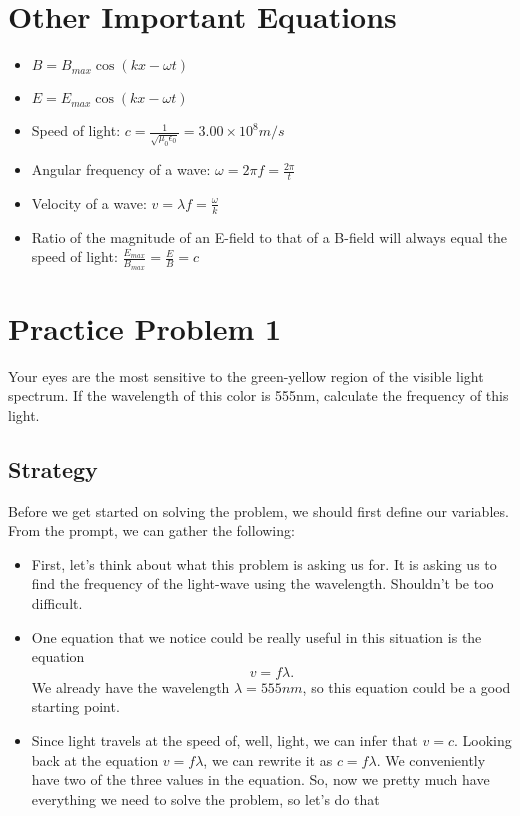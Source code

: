 \documentclass[12pt]{article}
\begin{document}
\section*{Other Important Equations}
\begin{itemize}
    \item \(B = B_{max}\cos{(kx-\omega t)}\)
    \item \(E = E_{max}\cos{(kx-\omega t)}\)
    \item Speed of light: \(c = \frac{1}{\sqrt{\mu_{0}\epsilon_{0}}} = 3.00\times 10^{8}m/s\)
    \item Angular frequency of a wave: \(\omega = 2\pi f = \frac{2\pi}{t}\)
    \item Velocity of a wave: \(v = \lambda f = \frac{\omega}{k}\)
    \item Ratio of the magnitude of an E-field to that of a B-field will always equal the speed of light: \( \frac{E_{max}}{B_{max}} =\frac{E}{B} = c\)
\end{itemize}


\section*{Practice Problem 1}
Your eyes are the most sensitive to the green-yellow region of the visible light spectrum. If the wavelength of this color is 555nm, calculate the frequency of this light.
\subsection*{Strategy}
Before we get started on solving the problem, we should first define our variables. From the prompt, we can gather the following:
\begin{itemize}
    \item First, let's think about what this problem is asking us for. It is asking us to find the frequency of the light-wave using the wavelength. Shouldn't be too difficult.
    \item One equation that we notice could be really useful in this situation is the equation \[v=f \lambda. \] We already have the wavelength \(\lambda = 555nm\), so this equation could be a good starting point.
    \item Since light travels at the speed of, well, light, we can infer that \(v=c\). Looking back at the equation \(v=f \lambda \), we can rewrite it as \(c = f \lambda\). We conveniently have two of the three values in the equation. So, now we pretty much have everything we need to solve the problem, so let's do that
\end{itemize}
\end{document}
